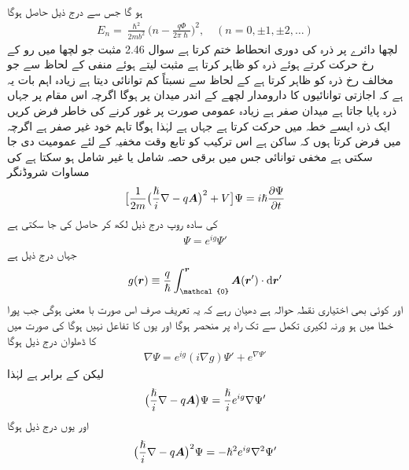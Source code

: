 ہو گا جس سے درج ذیل حاصل ہوگا 
\begin{align} 
E_n = \frac{\hslash^2}{2m b^2} \big ( n - \frac{q \Phi}{2 \pi \hslash} \big )^2, \quad (n = 0, \pm 1, \pm 2, \dotsc)
\end{align}
لچها  دائرے پر ذرہ کی دوری انحطاط ختم کرتا ہے سوال 2.46 مثبت  جو لچھا میں رو کے رخ حرکت کرتے ہوئے ذرہ کو ظاہر کرتا ہے  مثبت لیتے ہوئے منفی  کے لحاظ سے جو مخالف رخ ذرہ کو ظاہر کرتا ہے کے لحاظ سے نسبتاً کم توانائی دیتا ہے زیادہ اہم بات یہ ہے کہ اجازتی توانائیوں کا دارومدار لچھے کے اندر میدان پر ہوگا اگرچہ اس مقام پر جہاں ذرہ پایا جاتا ہے میدان صفر ہے زیادہ عمومی صورت پر غور کرنے کی خاطر فرض کریں ایک ذرہ  ایسے خطہ میں حرکت کرتا ہے جہاں  ہے لہٰذا  ہوگا تاہم  خود غیر صفر ہے اگرچہ میں فرض کرتا ہوں کہ  ساکن ہے اس ترکیب کو تابع وقت مخفیہ کے لئے عمومیت دی جا سکتی ہے مخفی توانائی  جس میں برقی حصہ  شامل یا غیر شامل ہو سکتا ہے کی مساوات شروڈنگر 
\begin{align} 
\big [ \frac{1}{2m} \big ( \frac{\hslash}{i} \nabla - q {{\boldsymbol{A}}} \big )^2 + V \big ] \Psi = i \hslash \frac{\partial \Psi}{\partial t}
\end{align}
کی سادہ روپ درج ذیل لکھ کر حاصل کی جا سکتی ہے 
\begin{align}
\Psi = e^{i g} \Psi'
\end{align}
جہاں  درج ذیل ہے 
\begin{align}
g (\kvec{r}) \equiv \frac{q}{\hslash} \int_{\mathcal{0}}^{\kvec{r}} \kvec{A} (\kvec{r}') \cdot \dif \kvec{r}'
\end{align}
اور  کوئی بھی اختیاری نقطہ حوالہ ہے دھیان رہے کہ یہ تعریف صرف اس صورت با معنی ہوگی جب پورا خطا میں  ہو ورنہ لکیری تکمل  سے  تک راہ پر منحصر ہوگا اور یوں  کا تفاعل نہیں ہوگا  کی صورت میں  کا ڈھلوان درج ذیل ہوگا 
\begin{align*}
\nabla \Psi = e^{i g} (i \nabla g) \Psi' + e^{\nabla \Psi'}
\end{align*}
لیکن  کے برابر ہے لہٰذا 
\begin{align}
\big ( \frac{\hslash}{i} \nabla - q {{\boldsymbol{A}}} \big ) \Psi = \frac{\hslash}{i} e^{i g} \nabla \Psi'
\end{align}
اور یوں درج ذیل ہوگا 
\begin{align}
\big ( \frac{\hslash}{i} \nabla - q {{\boldsymbol{A}}} \big )^2 \Psi = - \hslash^2 e^{i g} \nabla^2 \Psi'
\end{align}
